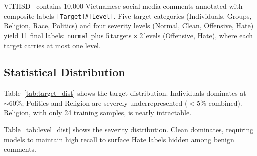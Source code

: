 \documentclass[conference]{IEEEtran}
\begin{document}
ViTHSD~\cite{vithsd} contains 10,000 Vietnamese social media comments annotated
with composite labels \texttt{[Target]\#[Level]}. Five target categories
(Individuals, Groups, Religion, Race, Politics) and four severity levels (Normal,
Clean, Offensive, Hate) yield 11 final labels: \texttt{normal} plus
5\,targets\,$\times$\,2\,levels (Offensive, Hate), where each target carries at
most one level.

\subsection{Statistical Distribution}

Table~\ref{tab:target_dist} shows the target distribution. Individuals dominates
at ${\sim}60\%$; Politics and Religion are severely underrepresented ($<$5\%
combined). Religion, with only 24 training samples, is nearly intractable.

\begin{table}[ht]
\centering
\caption{Distribution of Samples by Target Category}
\label{tab:target_dist}
\scriptsize
\setlength{\tabcolsep}{3pt}
\end{table}

Table~\ref{tab:level_dist} shows the severity distribution. Clean dominates,
requiring models to maintain high recall to surface Hate labels hidden among
benign comments.

\begin{table}[ht]
\centering
\caption{Distribution of Samples by Severity Level}
\label{tab:level_dist}
\scriptsize
\setlength{\tabcolsep}{3pt}
\end{table}
\end{document}
